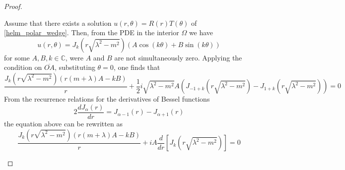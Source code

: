 \begin{proof}
\begin{enumerate}
    Assume that there exists a solution \(u(r, \theta) = R(r) T (\theta)\) of \eqref{helm_polar_wedge}. Then, from the \ac{PDE} in the interior \(\Omega\) we have
    \[
        u(r, \theta) = J_{k}\left(r \sqrt{\lambda^2-m^2}\right)\left(A \cos(k \theta)+B \sin(k \theta)\right)
    \]
    for some \(A, B, k \in \mathbb{C}\), were \(A\) and \(B\) are not simultaneously zero. Applying the condition on \(\overline{OA}\), substituting \(\theta=0\), one finds that
    \[
        \frac{J_{k}\left(r \sqrt{\lambda^2-m^2}\right)\left(r(m+\lambda)A-k B\right)}{r} + \frac{1}{2}i \sqrt{\lambda^2-m^2}A\left(J_{-1+k}\left(r \sqrt{\lambda^2-m^2}\right)-J_{1+k}\left(r \sqrt{\lambda^2-m^2}\right)\right)= 0
    \]
    From the recurrence relations for the derivatives of Bessel functions
    \[
        2 \frac{d J_\alpha (r)}{d r} = J_{\alpha-1} (r) - J_{\alpha+1} (r)
    \]
    the equation above can be rewritten as
    \[
        \frac{J_{k}\left(r \sqrt{\lambda^2-m^2}\right)\left(r(m+\lambda)A-k B\right)}{r} + i A \frac{d}{d r}\left[J_{k}\left(r \sqrt{\lambda^2-m^2}\right)\right]= 0
\]
\end{enumerate}
\end{proof}
